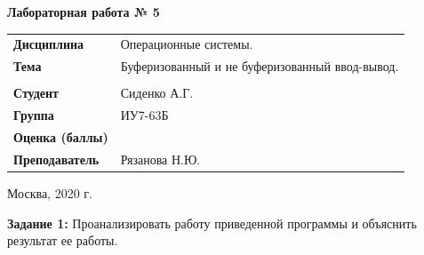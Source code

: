 \documentclass[a4paper,14pt]{extreport} %
\begin{document}
\begin{titlepage}
    \vspace{2cm}

    \begin{center}
        \textbf{Лабораторная работа № 5} \\
        \vspace{0.5cm}
    \end{center}

    \vspace{4cm}

    \begin{flushleft}
        \begin{tabular}{ll}
            \textbf{Дисциплина} & Операционные системы.  \\
            \textbf{Тема} & Буферизованный и не буферизованный ввод-вывод.  \\
            \\
            \textbf{Студент} & Сиденко А.Г. \\
            \textbf{Группа} & ИУ7-63Б \\
            \textbf{Оценка (баллы)} & \\
            \textbf{Преподаватель} & Рязанова Н.Ю.   \\
        \end{tabular}
    \end{flushleft}

    \vspace{4cm}

   \begin{center}
        Москва, 2020 г.
    \end{center}

\end{titlepage}

\hfill

\textbf{Задание 1:} Проанализировать работу приведенной программы и объяснить результат ее работы.
\end{document}
